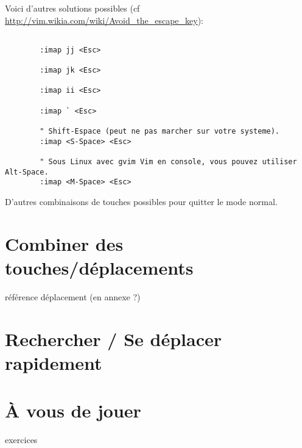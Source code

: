 Voici d'autres solutions possibles (cf \url{http://vim.wikia.com/wiki/Avoid_the_escape_key}):

\begin{listing}[H]
    \begin{verbatim}

        :imap jj <Esc>

        :imap jk <Esc>

        :imap ii <Esc>

        :imap ` <Esc>

        " Shift-Espace (peut ne pas marcher sur votre systeme).
        :imap <S-Space> <Esc>

        " Sous Linux avec gvim Vim en console, vous pouvez utiliser Alt-Space.
        :imap <M-Space> <Esc>
    \end{verbatim}
    \caption{D'autres combinaisons de touches possibles pour quitter le mode normal.}
    \label{code:avoid-esc-alt}
\end{listing}


\section{Combiner des touches/déplacements}
\label{sec:combine-move}
\TODO référence déplacement \vim (en annexe ?)

\section{Rechercher / Se déplacer rapidement}

\section{À vous de jouer}

\TODO exercices
